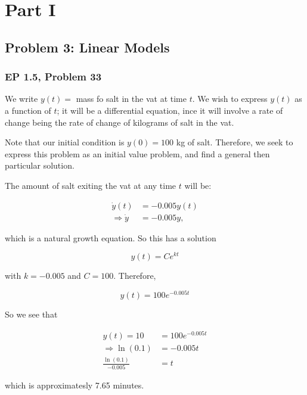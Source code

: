 \documentclass{article}
\begin{document}
\section{Part I}
\label{sec:parti}

\subsection{Problem 3: Linear Models}

\subsubsection{EP 1.5, Problem 33}

We write $y(t) = $ mass fo salt in the vat at time $t$. We wish to express $y(t)$ as a function of $t$; it will be a differential equation, ince it will involve a rate of change being the rate of change of kilograms of salt in the vat.

Note that our initial condition is $y(0) = 100$ kg of salt. Therefore, we seek to express this problem as an initial value problem, and find a general then particular solution.

The amount of salt exiting the vat at any time $t$ will be:

\begin{align}
  \label{eq:saltexitingvat}
  \dot{y}(t) &= -0.005 y(t) \\
  \Rightarrow \dot{y} &= -0.005 y,
\end{align}

which is a natural growth equation. So this has a solution

\begin{equation}
  \label{eq:solutionsaltgrowth}
  y(t) = Ce^{kt}
\end{equation}

with $k = -0.005$ and $C = 100$. Therefore,

\begin{equation}
  y(t) = 100 e^{-0.005t}
\end{equation}

So we see that

\begin{align}
  y(t) = 10 &= 100 e^{-0.005 t} \\
  \Rightarrow \ln(0.1) &= -0.005 t \\
  \frac{\ln(0.1)}{-0.005} &= t
\end{align}

which is approximatesly 7.65 minutes.
\end{document}
